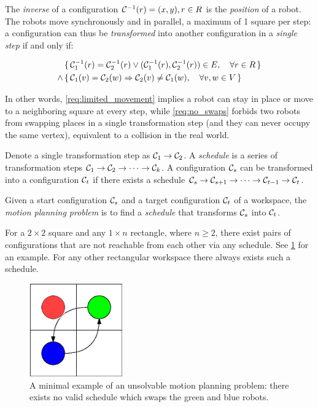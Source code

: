 The \emph{inverse} of a configuration $\mathcal{C}_{}^{-1}(r) = (x, y), r \in R$ is the \emph{position} of a robot. 
The robots move synchronously and in parallel, a maximum of 1 square per step:
a configuration can thus be \emph{transformed} into another configuration in a \emph{single step} if and only if:

\begin{align}
	& \set{\mathcal{C}_{1}^{-1}(r) = \mathcal{C}_{2}^{-1}(r) \lor (\mathcal{C}_{1}^{-1}(r), \mathcal{C}_{2}^{-1}(r)) \in E, \quad \forall r \in R}\label{req:limited_movement}\\
	\land & \set{\mathcal{C}_{1}(v) = \mathcal{C}_{2}(w) \Rightarrow \mathcal{C}_{2}(v) \neq \mathcal{C}_{1}(w), \quad \forall v, w \in V}\label{req:no_swaps}
\end{align}

In other words, \cref{req:limited_movement} implies a robot can stay in place or move to a neighboring square at every step, while \cref{req:no_swaps} forbids two robots from swapping places in a single transformation step (and they can never occupy the same vertex), equivalent to a collision in the real world.

Denote a single transformation step as $\mathcal{C}_{1} \rightarrow \mathcal{C}_{2}$.
A \emph{schedule} is a series of transformation steps $\mathcal{C}_{1} \rightarrow \mathcal{C}_{2} \rightarrow \cdots \rightarrow \mathcal{C}_{k}$. 
A configuration $\mathcal{C}_{s}$ can be transformed into a configuration $\mathcal{C}_{t}$ if there exists a schedule $\mathcal{C}_{s} \rightarrow \mathcal{C}_{s + 1} \rightarrow \cdots \rightarrow \mathcal{C}_{t - 1} \rightarrow \mathcal{C}_{t}$.


\begin{definition}\label{def:motion_planning_problem}
	Given a start configuration $\mathcal{C}_{s}$ and a target configuration $\mathcal{C}_{t}$ of a workspace, 
	the \emph{motion planning problem} is to find a \emph{schedule} that transforms $\mathcal{C}_{s}$ into $\mathcal{C}_{t}$.
\end{definition}

\begin{remark}\label{remark:reachability}
	For a $2 \times 2$ square and any $1 \times n$ rectangle, where $n \geq 2$, there exist pairs of configurations that are not reachable from each other via any schedule. See \cref{fig:reachability} for an example.
	For any other rectangular workspace there always exists such a schedule. 
\end{remark}

\begin{figure}[h]
	\centering
	\includegraphics[width=4cm]{include/impossible_2x2.eps}
	\caption{A minimal example of an unsolvable motion planning problem: there exists no valid schedule which swaps the green and blue robots.}\label{fig:reachability}
\end{figure}

